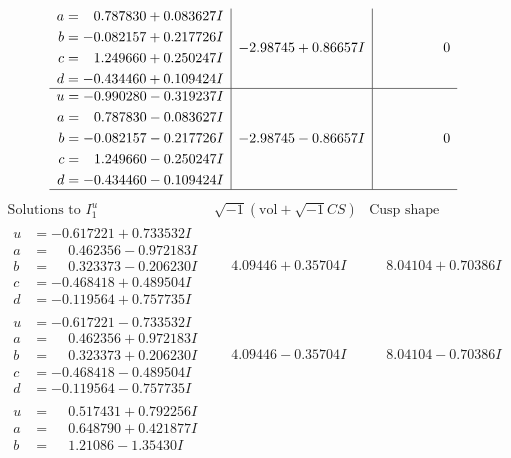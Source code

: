 \documentclass[1p]{elsarticle_modified}
\theoremstyle{definition}
\newcommand{\I}{\sqrt{-1}}
\begin{document}
$$\begin{array}{c|c|c}
\begin{aligned}
a &= \phantom{-}0.787830 + 0.083627 I \\
b &= -0.082157 + 0.217726 I \\
c &= \phantom{-}1.249660 + 0.250247 I \\
d &= -0.434460 + 0.109424 I\end{aligned}
 & -2.98745 + 0.86657 I & \phantom{-0.000000 } 0 \\ \hline\begin{aligned}
u &= -0.990280 - 0.319237 I \\
a &= \phantom{-}0.787830 - 0.083627 I \\
b &= -0.082157 - 0.217726 I \\
c &= \phantom{-}1.249660 - 0.250247 I \\
d &= -0.434460 - 0.109424 I\end{aligned}
 & -2.98745 - 0.86657 I & \phantom{-0.000000 } 0\\
 \hline 
 \end{array}$$\newpage$$\begin{array}{c|c|c}  
\text{Solutions to }I^u_{1}& \I (\text{vol} + \sqrt{-1}CS) & \text{Cusp shape}\\
 \hline 
\begin{aligned}
u &= -0.617221 + 0.733532 I \\
a &= \phantom{-}0.462356 - 0.972183 I \\
b &= \phantom{-}0.323373 - 0.206230 I \\
c &= -0.468418 + 0.489504 I \\
d &= -0.119564 + 0.757735 I\end{aligned}
 & \phantom{-}4.09446 + 0.35704 I & \phantom{-}8.04104 + 0.70386 I \\ \hline\begin{aligned}
u &= -0.617221 - 0.733532 I \\
a &= \phantom{-}0.462356 + 0.972183 I \\
b &= \phantom{-}0.323373 + 0.206230 I \\
c &= -0.468418 - 0.489504 I \\
d &= -0.119564 - 0.757735 I\end{aligned}
 & \phantom{-}4.09446 - 0.35704 I & \phantom{-}8.04104 - 0.70386 I \\ \hline\begin{aligned}
u &= \phantom{-}0.517431 + 0.792256 I \\
a &= \phantom{-}0.648790 + 0.421877 I \\
b &= \phantom{-}1.21086 - 1.35430 I \\

\end{aligned}
\end{array}$$
\end{document}
